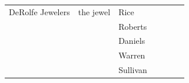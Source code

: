 \documentclass{article}
\begin{document}
\begin{landscape}
\begin{table}[]
\begin{tabular}{lllllll}
DeRolfe Jewelers          & the jewel             & Rice             &                          &                       &                   &                           \\
                          &                       & Roberts          &                          &                       &                   &                           \\
                          &                       & Daniels          &                          &                       &                   &                           \\
                          &                       & Warren           &                          &                       &                   &                           \\
                          &                       & Sullivan         &                          &                       &                   &                          
\end{tabular}
\end{table}
\end{landscape}
\restoregeometry
\end{document}
